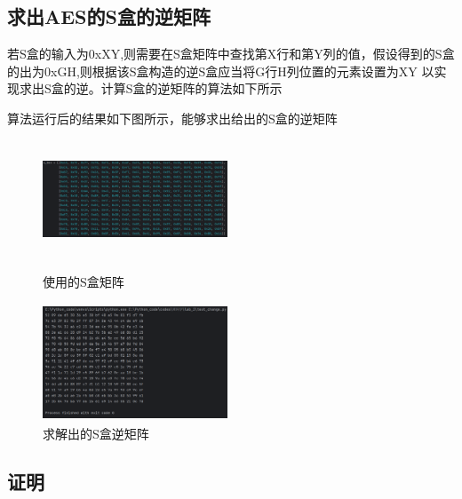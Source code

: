 \documentclass[a4paper,11pt,UTF8]{ctexart}
\begin{document}
    \subsection{求出AES的S盒的逆矩阵}
        若S盒的输入为0xXY,则需要在S盒矩阵中查找第X行和第Y列的值，假设得到的S盒的出为0xGH,则根据该S盒构造的逆S盒应当将G行H列位置的元素设置为XY
        以实现求出S盒的逆。计算S盒的逆矩阵的算法如下所示
        
        算法运行后的结果如下图所示，能够求出给出的S盒的逆矩阵
        \begin{figure}[htbp]
            \begin{minipage}[t]{0.45\linewidth}
                \centering
                \includegraphics[width=5.5cm,height=3.5cm]{S盒.png}
                \caption{使用的S盒矩阵}
            \end{minipage}
            \begin{minipage}[t]{0.45\linewidth}        %
                \hspace{10pt}
                \includegraphics[width=5.5cm,height=3.5cm]{S-1.png}
                \caption{求解出的S盒逆矩阵}
            \end{minipage}
        \end{figure}
        
\newpage
    \subsection{证明}
\end{document}
